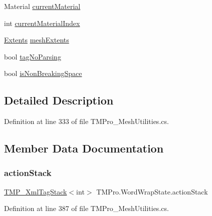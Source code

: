 \begin{DoxyCompactItemize}
\item 
Material \mbox{\hyperlink{struct_t_m_pro_1_1_word_wrap_state_ab65e034cc8bc9bb50359e02979818c71}{current\+Material}}
\item 
int \mbox{\hyperlink{struct_t_m_pro_1_1_word_wrap_state_adfb274db976183aac0e2e9394872a69c}{current\+Material\+Index}}
\item 
\mbox{\hyperlink{struct_t_m_pro_1_1_extents}{Extents}} \mbox{\hyperlink{struct_t_m_pro_1_1_word_wrap_state_a66b066a5fe77a6e1e63dc06c1259c0b7}{mesh\+Extents}}
\item 
bool \mbox{\hyperlink{struct_t_m_pro_1_1_word_wrap_state_a9b2f00c7a1fd24c21ec77d30382a3afc}{tag\+No\+Parsing}}
\item 
bool \mbox{\hyperlink{struct_t_m_pro_1_1_word_wrap_state_a40e1610933cb2b7b185d22ae69ee40c6}{is\+Non\+Breaking\+Space}}
\end{DoxyCompactItemize}


\subsection{Detailed Description}


Definition at line 333 of file T\+M\+Pro\+\_\+\+Mesh\+Utilities.\+cs.



\subsection{Member Data Documentation}
\mbox{\label{struct_t_m_pro_1_1_word_wrap_state_a2f76d3d72e75992daa72b29bda31c649}} 
\subsubsection{\texorpdfstring{actionStack}{actionStack}}
{\footnotesize\ttfamily \mbox{\hyperlink{struct_t_m_pro_1_1_t_m_p___xml_tag_stack}{T\+M\+P\+\_\+\+Xml\+Tag\+Stack}}$<$int$>$ T\+M\+Pro.\+Word\+Wrap\+State.\+action\+Stack}



Definition at line 387 of file T\+M\+Pro\+\_\+\+Mesh\+Utilities.\+cs.

\mbox{\label{struct_t_m_pro_1_1_word_wrap_state_a4e61211834f6c240592e4010214ba8eb}} 
